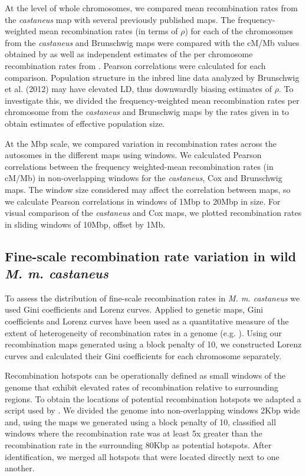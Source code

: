 At the level of whole chromosomes, we compared mean recombination rates from the \textit{castaneus} map with several previously published maps. The frequency-weighted mean recombination rates (in terms of $\rho$) for each of the chromosomes from the \textit{castaneus} and Brunschwig maps were compared with the cM/Mb values obtained by \cite{RN232} as well as independent estimates of the per chromosome recombination rates from \cite{RN184}. Pearson correlations were calculated for each comparison. Population structure in the inbred line data analyzed by Brunschwig et al. (2012) may have elevated LD, thus downwardly biasing estimates of $\rho$. To investigate this, we divided the frequency-weighted mean recombination rates per chromosome from the \textit{castaneus} and Brunschwig maps by the rates given in \cite{RN232} to obtain estimates of effective population size.
 
At the Mbp scale, we compared variation in recombination rates across the autosomes in the different maps using windows. We calculated Pearson correlations between the frequency weighted-mean recombination rates (in cM/Mb) in non-overlapping windows for the \textit{castaneus}, Cox and Brunschwig maps. The window size considered may affect the correlation between maps, so we calculate Pearson correlations in windows of 1Mbp to 20Mbp in size. For visual comparison of the \textit{castaneus} and Cox maps, we plotted recombination rates in sliding windows of 10Mbp, offset by 1Mb. 

\subsection{Fine-scale recombination rate variation in wild \emph{M. m. castaneus}}

To assess the distribution of fine-scale recombination rates in \emph{M. m. castaneus} we used Gini coefficients and Lorenz curves. Applied to genetic maps, Gini coefficients and Lorenz curves have been used as a quantitative measure of the extent of heterogeneity of recombination rates in a genome (e.g. \citealt{RN333}). Using our recombination maps generated using a block penalty of 10, we constructed Lorenz curves and calculated their Gini coefficients for each chromosome separately.

	Recombination hotspots can be operationally defined as small windows of the genome that exhibit elevated rates of recombination relative to surrounding regions. To obtain the locations of potential recombination hotspots we adapted a script used by \cite{RN258}. We divided the genome into non-overlapping windows 2Kbp wide and, using the maps we generated using a block penalty of 10, classified all windows where the recombination rate was at least 5x greater than the recombination rate in the surrounding 80Kbp as potential hotspots. After identification, we merged all hotspots that were located directly next to one another.

